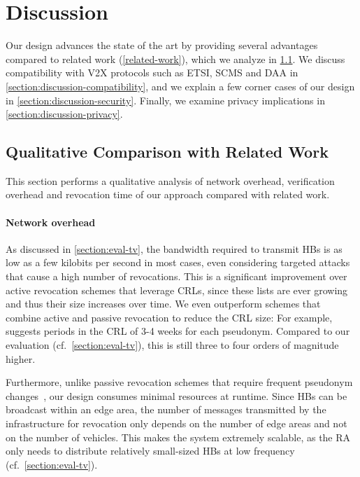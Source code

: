 \section{Discussion}
\label{chapter:discussion}

Our design advances the state of the art by providing several advantages
compared to related work (\cref{related-work}), which we analyze in
\cref{section:discussion-comparison}. %
We discuss compatibility with
\ac{V2X} protocols such as ETSI, SCMS and \ac{DAA} in
\cref{section:discussion-compatibility}, and we explain a few corner cases of
our design in \cref{section:discussion-security}. Finally, we examine privacy
implications in \cref{section:discussion-privacy}.

\subsection{Qualitative Comparison with Related Work}
\label{section:discussion-comparison}

This section performs a qualitative analysis of network overhead, verification
overhead and revocation time of our approach compared with related work.

\paragraph{Network overhead}
%
As discussed in \cref{section:eval-tv}, the bandwidth required to transmit
\acp{HB} is as low as a few kilobits per second in most cases, even considering
targeted attacks that cause a high number of revocations. This is a significant
improvement over active revocation schemes that leverage \acp{CRL}, since these
lists are ever growing and thus their size increases over time. We even
outperform schemes that combine active and passive revocation to reduce the
\ac{CRL} size: For example,~\cite{simplicio2019acpc} suggests periods in the
\ac{CRL} of 3-4 weeks for each pseudonym. Compared to our evaluation
(cf.~\cref{section:eval-tv}), this is still three to four orders of magnitude
higher.

Furthermore, unlike passive revocation schemes that require frequent pseudonym
changes~\cite{hicks2020vehicular}, our design consumes minimal resources at
runtime. Since \acp{HB} can be broadcast within an edge area, the number of
messages transmitted by the infrastructure for revocation only depends on the
number of edge areas and not on the number of vehicles. This makes the system
extremely scalable, as the \ac{RA} only needs to distribute relatively
small-sized \acp{HB} at low frequency (cf.~\cref{section:eval-tv}).

